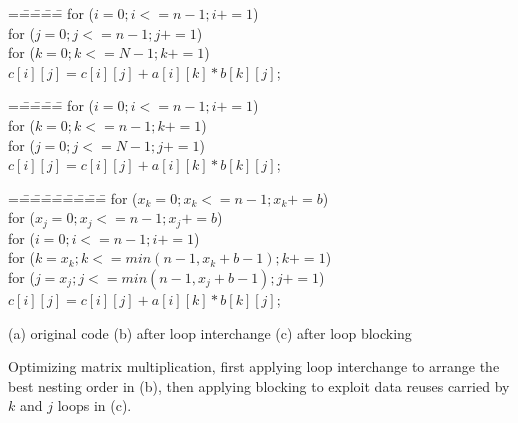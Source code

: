 

\begin {figure*}
\beginfig
{\footnotesize %
\begin {minipage}{.2\textwidth}
\begin {tabbing}
=\==\==\==\==\kill
\> for ($i = 0; i <= n-1; i+= 1$)  \\
\>\>  for ($j = 0; j <= n-1; j+= 1$) \\
\>\>\>  for ($k = 0; k <= N-1; k+=1$)  \\
\>\>\>\>  $c[i][j] = c[i][j] + a[i][k] * b[k][j]$; 
\end {tabbing}
\end {minipage}
\begin {minipage}{.2\textwidth}
\begin {tabbing}
=\==\==\==\==\kill
\> for ($i = 0; i <= n-1; i+= 1$)  \\
\>\>  for ($k = 0; k <= n-1; k+= 1$) \\
\>\>\>  for ($j = 0; j <= N-1; j+=1$)  \\
\>\>\>\>  $c[i][j] = c[i][j] + a[i][k] * b[k][j]$; 
\end {tabbing}
\end {minipage}
\begin {minipage}{.3\textwidth}
\begin {tabbing}
=\==\==\==\==\==\==\==\==\kill
\> for ($x_k = 0; x_k <= n-1; x_k += b$)  \\
\>\>  for ($x_j = 0; x_j <= n-1; x_j += b$)  \\
\>\>\>  for ($i = 0; i <= n-1; i += 1$)  \\
\>\>\>\>  for ($k = x_k; k <= min(n-1,x_k + b-1); k += 1$)  \\
\>\>\>\>\>  for ($j = x_j; j <= min(n-1,x_j + b-1); j += 1$)  \\
\>\>\>\>\>\>  $c[i][j] = c[i][j] + a[i][k] * b[k][j]$; 
\end {tabbing}
\end {minipage}
\begin {minipage}{\textwidth}
\hspace{.08\textwidth} (a) original code  \hspace{.1\textwidth}
(b) after loop interchange 
\hspace{.1\textwidth} (c) after loop blocking
\end {minipage}
}
\endfig
\caption {Optimizing matrix multiplication, first applying loop interchange
to arrange the best nesting order in (b), then applying blocking to 
exploit data reuses carried by $k$ and $j$ loops in (c).}
\label {fig-mm}
\end {figure*}

